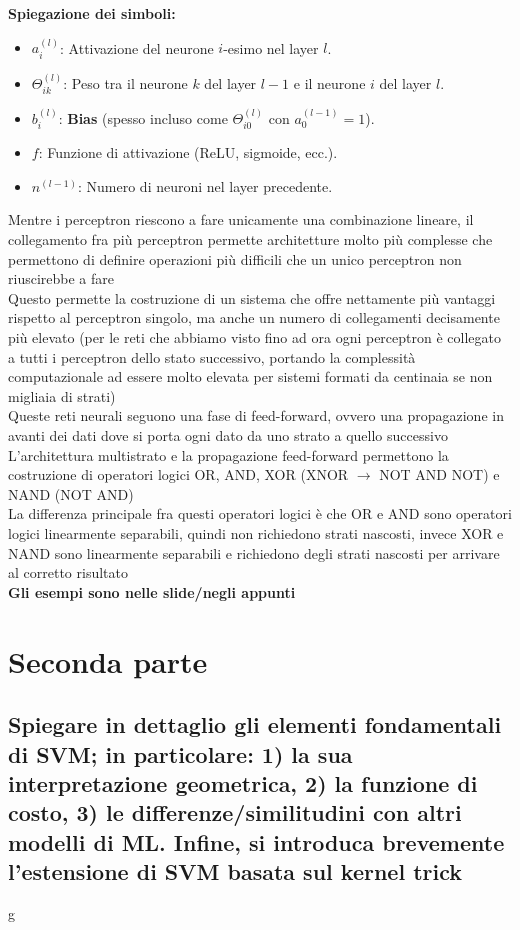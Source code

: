 \documentclass[10pt,oneside,a4paper]{article}
\begin{document}
	\textbf{Spiegazione dei simboli:}
	\begin{itemize}
		\item $a_i^{(l)}$: Attivazione del neurone $i$-esimo nel layer $l$.
		\item $\Theta_{ik}^{(l)}$: Peso tra il neurone $k$ del layer $l-1$ e il neurone $i$ del layer $l$.
		\item $b_i^{(l)}$: \textbf{Bias} (spesso incluso come $\Theta_{i0}^{(l)}$ con $a_0^{(l-1)} = 1$).
		\item $f$: Funzione di attivazione (ReLU, sigmoide, ecc.).
		\item $n^{(l-1)}$: Numero di neuroni nel layer precedente.
	\end{itemize}
	Mentre i perceptron riescono a fare unicamente una combinazione lineare, il collegamento fra più perceptron permette architetture molto più complesse che permettono di definire operazioni più difficili che un unico perceptron non riuscirebbe a fare\\
	Questo permette la costruzione di un sistema che offre nettamente più vantaggi rispetto al perceptron singolo, ma anche un numero di collegamenti decisamente più elevato (per le reti che abbiamo visto fino ad ora ogni perceptron è collegato a tutti i perceptron dello stato successivo, portando la complessità computazionale ad essere molto elevata per sistemi formati da centinaia se non migliaia di strati)\\
	Queste reti neurali seguono una fase di feed-forward, ovvero una propagazione in avanti dei dati dove si porta ogni dato da uno strato a quello successivo\\
	L'architettura multistrato e la propagazione feed-forward permettono la costruzione di operatori logici OR, AND, XOR (XNOR $\to$ NOT AND NOT) e NAND (NOT AND)\\
	La differenza principale fra questi operatori logici è che OR e AND sono operatori logici linearmente separabili, quindi non richiedono strati nascosti, invece XOR e NAND sono linearmente separabili e richiedono degli strati nascosti per arrivare al corretto risultato\\
	\textbf{Gli esempi sono nelle slide/negli appunti}	
		
	
	\newpage
	\section{Seconda parte}
	\subsection{Spiegare in dettaglio gli elementi fondamentali di SVM; in particolare:
		1) la sua interpretazione geometrica, 2) la funzione di costo, 3) le differenze/similitudini con altri modelli di ML.
		Infine, si introduca brevemente l’estensione di SVM basata sul kernel trick}
	g
	
\end{document}
